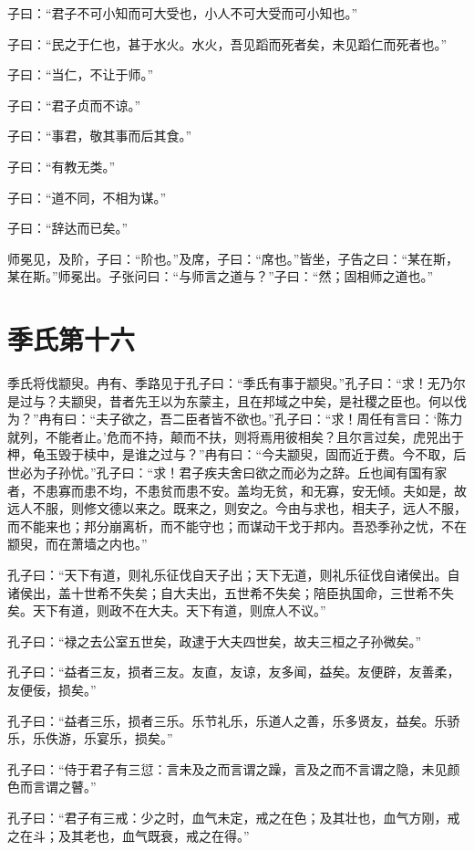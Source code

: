 \documentclass[twoside,openany]{book}
\begin{document}
子曰：“君子不可小知而可大受也，小人不可大受而可小知也。”

子曰：“民之于仁也，甚于水火。水火，吾见蹈而死者矣，未见蹈仁而死者也。”

子曰：“当仁，不让于师。”

子曰：“君子贞而不谅。”

子曰：“事君，敬其事而后其食。”

子曰：“有教无类。”

子曰：“道不同，不相为谋。”

子曰：“辞达而已矣。”

师冕见，及阶，子曰：“阶也。”及席，子曰：“席也。”皆坐，子告之曰：“某在斯，某在斯。”师冕出。子张问曰：“与师言之道与？”子曰：“然；固相师之道也。”


\chapter{季氏第十六}\label{ch16}

季氏将伐颛臾。冉有、季路见于孔子曰：“季氏有事于颛臾。”孔子曰：“求！无乃尔是过与？夫颛臾，昔者先王以为东蒙主，且在邦域之中矣，是社稷之臣也。何以伐为？”冉有曰：“夫子欲之，吾二臣者皆不欲也。”孔子曰：“求！周任有言曰：‘陈力就列，不能者止。’危而不持，颠而不扶，则将焉用彼相矣？且尔言过矣，虎兕出于柙，龟玉毁于椟中，是谁之过与？”冉有曰：“今夫颛臾，固而近于费。今不取，后世必为子孙忧。”孔子曰：“求！君子疾夫舍曰欲之而必为之辞。丘也闻有国有家者，不患寡而患不均，不患贫而患不安。盖均无贫，和无寡，安无倾。夫如是，故远人不服，则修文德以来之。既来之，则安之。今由与求也，相夫子，远人不服，而不能来也；邦分崩离析，而不能守也；而谋动干戈于邦内。吾恐季孙之忧，不在颛臾，而在萧墙之内也。”

孔子曰：“天下有道，则礼乐征伐自天子出；天下无道，则礼乐征伐自诸侯出。自诸侯出，盖十世希不失矣；自大夫出，五世希不失矣；陪臣执国命，三世希不失矣。天下有道，则政不在大夫。天下有道，则庶人不议。”

孔子曰：“禄之去公室五世矣，政逮于大夫四世矣，故夫三桓之子孙微矣。”

孔子曰：“益者三友，损者三友。友直，友谅，友多闻，益矣。友便辟，友善柔，友便佞，损矣。”

孔子曰：“益者三乐，损者三乐。乐节礼乐，乐道人之善，乐多贤友，益矣。乐骄乐，乐佚游，乐宴乐，损矣。”

孔子曰：“侍于君子有三愆：言未及之而言谓之躁，言及之而不言谓之隐，未见颜色而言谓之瞽。”

孔子曰：“君子有三戒：少之时，血气未定，戒之在色；及其壮也，血气方刚，戒之在斗；及其老也，血气既衰，戒之在得。”
\end{document}

